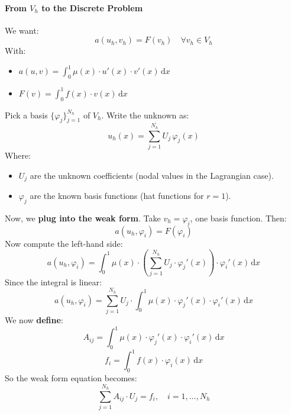\paragraph[From V\texorpdfstring{$_h$}{\_h} to the Discrete Problem]{From $V_{h}$ to the Discrete Problem}

We want:
\begin{equation*}
    a(u_h, v_h) = F(v_h) \quad \forall v_h \in V_h
\end{equation*}
With:
\begin{itemize}
    \item $a(u,v) = \displaystyle\int_{0}^{1} \mu(x) \cdot u'(x) \cdot v'(x)\, \mathrm{d}x$
    \item $F(v) = \displaystyle\int_{0}^{1} f(x) \cdot v(x)\, \mathrm{d}x$
\end{itemize}
Pick a basis $\{\varphi_j\}_{j=1}^{N_h}$ of $V_h$. Write the unknown as:
\begin{equation}
    u_h(x) = \sum_{j=1}^{N_h} U_j \, \varphi_j(x)
\end{equation}
Where:
\begin{itemize}
    \item $U_j$ are the unknown coefficients (nodal values in the Lagrangian case).
    \item $\varphi_j$ are the known basis functions (hat functions for $r=1$).
\end{itemize}

\highspace
Now, we \textbf{plug into the weak form}. Take $v_h = \varphi_i$, one basis function. Then:
\begin{equation*}
    a(u_h, \varphi_i) = F(\varphi_i)
\end{equation*}
Now compute the left-hand side:
\begin{equation*}
    a(u_h, \varphi_i) = \int_0^1 \mu(x) \cdot \left(\sum_{j=1}^{N_h} U_j \cdot \varphi_j'(x)\right) \cdot \varphi_i'(x)\, \mathrm{d}x
\end{equation*}
Since the integral is linear:
\begin{equation*}
    a(u_h, \varphi_i) = \sum_{j=1}^{N_h} U_j \cdot \int_0^1 \mu(x) \cdot \varphi_j'(x) \cdot \varphi_i'(x)\, \mathrm{d}x
\end{equation*}
We now \textbf{define}:
\begin{equation}
    A_{ij} = \int_0^1 \mu(x) \cdot \varphi_j'(x) \cdot \varphi_i'(x)\, \mathrm{d}x
\end{equation}
\begin{equation}\label{eq: nodal forces}
    f_i = \int_0^1 f(x) \cdot \varphi_i(x)\, \mathrm{d}x
\end{equation}
So the weak form equation becomes:
\begin{equation}
    \sum_{j=1}^{N_h} A_{ij} \cdot U_j = f_i, \quad i=1,\dots,N_h
\end{equation}

